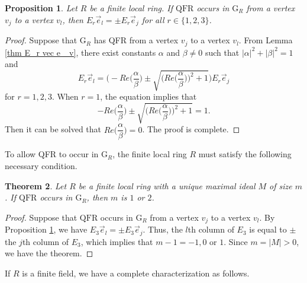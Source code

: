 \documentclass[12pt]{amsart}
\numberwithin{equation}{section}
\newtheorem{thm}{Theorem}[section]
\newtheorem{prop}[thm]{Proposition}
\theoremstyle{definition}
\theoremstyle{definition} \numberwithin{equation}{section}
\newcommand{\G}{\mathrm{G}}
\newcommand{\QFR}{\mathrm{QFR}}
\begin{document}
\begin{prop}
\label{plus-minus}
    Let $R$ be a finite local ring. If $\QFR$ occurs in $\G_R$ from a vertex $v_j$ to a vertex $v_l$, then $E_r \vec{e}_l = \pm E_r \vec{e}_j$ for all $r \in \{1,2,3\}$.
\end{prop}
\begin{proof}
Suppose that $\G_R$ has QFR from a vertex $v_j$ to a vertex $v_l$.
    From Lemma \ref{thm E_r vec e _v}, there exist constants $\alpha$ and $\beta \neq 0$ such that $|\alpha|^2+|\beta|^2=1$ and 
    \begin{equation*}
    E_r \vec{e}_l = \Big( -Re \Big(\frac{\alpha}{\beta}\Big) \pm \sqrt{\Big(Re \Big( \frac{\alpha}{\beta}\Big)\Big)^2 + 1} \Big) E_r \vec{e}_j
    \end{equation*} for $r = 1, 2, 3$.
    When $r = 1$, the equation implies that 
    $$
    -Re \Big(\frac{\alpha}{\beta}\Big) \pm \sqrt{\Big(Re \Big( \frac{\alpha}{\beta}\Big)\Big)^2 + 1} = 1.
    $$
    Then it can be solved that $Re \Big(\dfrac{\alpha}{\beta}\Big) = 0$. The proof is complete.
\end{proof}

To allow QFR to occur in $\G_R$, the finite local ring $R$ must satisfy the following necessary condition.

\begin{thm}\label{m12}
    Let $R$ be a finite local ring with a unique maximal ideal $M$ of size $m$. If $\QFR$ occurs in $\G_R$, then $m$ is $1$ or $2$.
\end{thm}
\begin{proof}
    Suppose that $\QFR$ occurs in $\G_R$ from a vertex $v_j$ to a vertex $v_l$.
    By Proposition \ref{plus-minus}, we have $E_3 \vec{e}_l = \pm E_3 \vec{e}_j$. Thus, the $l$th column of $E_3$ is equal to $\pm$ the $j$th column of $E_3$, which implies that $m-1 = -1, 0$ or $1$. Since $m = |M| > 0$, we have the theorem.
\end{proof}

If $R$ is a finite field, we have a complete characterization as follows.
\end{document}
